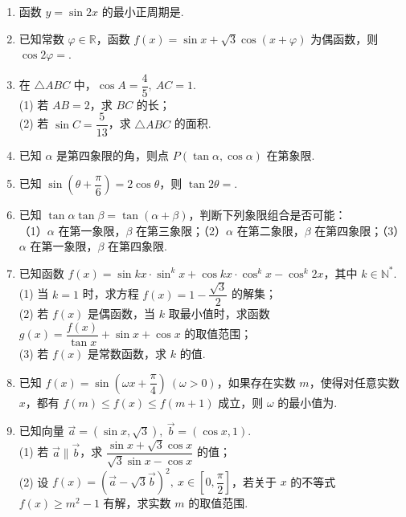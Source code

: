 \documentclass[UTF8,11pt]{ctexart}
\newcommand{\blank}{\underline{\hspace{2.8cm}}}
\begin{document}
\begin{enumerate}
\item 函数 $y=\sin2x$ 的最小正周期是\blank.

\item 已知常数 $\varphi\in\mathbb R$，函数 $f(x)=\sin x+\sqrt3\cos(x+\varphi)$ 为偶函数，则 $\cos2\varphi=$\blank.

\item 在 $\triangle ABC$ 中，$\cos A=\dfrac45,\ AC=1$.\\
(1) 若 $AB=2$，求 $BC$ 的长；\\
(2) 若 $\sin C=\dfrac5{13}$，求 $\triangle ABC$ 的面积.

\item 已知 $\alpha$ 是第四象限的角，则点 $P(\tan\alpha,\cos\alpha)$ 在第\blank 象限.

\item 已知 $\sin\left(\theta+\dfrac\pi6\right)=2\cos\theta$，则 $\tan2\theta=$\blank.

\item 已知 $\tan\alpha\tan\beta=\tan(\alpha+\beta)$，判断下列象限组合是否可能：\\
（1）$\alpha$ 在第一象限，$\beta$ 在第三象限；（2）$\alpha$ 在第二象限，$\beta$ 在第四象限；（3）$\alpha$ 在第一象限，$\beta$ 在第四象限.

\item 已知函数 $f(x)=\sin kx\cdot\sin^k x+\cos kx\cdot\cos^k x-\cos^k 2x$，其中 $k\in\mathbb N^*$.\\
(1) 当 $k=1$ 时，求方程 $f(x)=1-\dfrac{\sqrt3}{2}$ 的解集；\\
(2) 若 $f(x)$ 是偶函数，当 $k$ 取最小值时，求函数 $g(x)=\dfrac{f(x)}{\tan x}+\sin x+\cos x$ 的取值范围；\\
(3) 若 $f(x)$ 是常数函数，求 $k$ 的值.

\item 已知 $f(x)=\sin\left(\omega x+\dfrac\pi4\right)\ (\omega>0)$，如果存在实数 $m$，使得对任意实数 $x$，都有 $f(m)\le f(x)\le f(m+1)$ 成立，则 $\omega$ 的最小值为\blank.

\item 已知向量 $\vec a=(\sin x,\sqrt3),\ \vec b=(\cos x,1)$.\\
(1) 若 $\vec a\parallel\vec b$，求 $\dfrac{\sin x+\sqrt3\cos x}{\sqrt3\sin x-\cos x}$ 的值；\\
(2) 设 $f(x)=\left(\vec a-\sqrt3\vec b\right)^2,\ x\in\left[0,\dfrac\pi2\right]$，若关于 $x$ 的不等式 $f(x)\ge m^2-1$ 有解，求实数 $m$ 的取值范围.
\end{enumerate}
\end{document}
